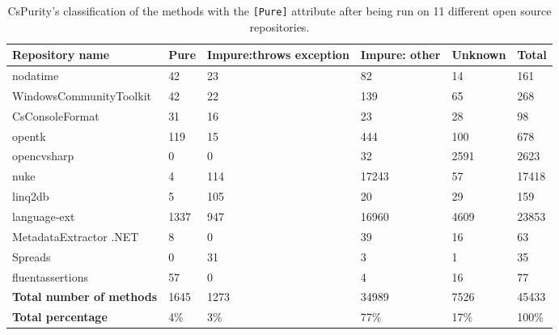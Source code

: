 \documentclass[a4paper,12pt]{article}
\begin{document}

\begin{table}[H]
  \small
  \caption{CsPurity's classification of the methods with the \texttt{[Pure]} attribute after being run on 11 different open source repositories.}
  \label{tab:results-pure-methods}
  \centering
  \begin{tabular}{|l|lp{2.8cm}p{1.4cm}l|l|}
    \hline
    \textbf{Repository name} & \textbf{Pure} & \textbf{Impure:\newline throws exception} & \textbf{Impure: other} & \textbf{Unknown} & \textbf{Total} \\
    \hline
    nodatime                & 42   & 23   & 82    & 14   & 161   \\
    WindowsCommunityToolkit & 42   & 22   & 139   & 65   & 268   \\
    CsConsoleFormat         & 31   & 16   & 23    & 28   & 98    \\
    opentk                  & 119  & 15   & 444   & 100  & 678   \\
    opencvsharp             & 0    & 0    & 32    & 2591 & 2623  \\
    nuke                    & 4    & 114  & 17243 & 57   & 17418 \\
    linq2db                 & 5    & 105  & 20    & 29   & 159   \\
    language-ext            & 1337 & 947  & 16960 & 4609 & 23853 \\
    MetadataExtractor .NET  & 8    & 0    & 39    & 16   & 63    \\
    Spreads                 & 0    & 31   & 3     & 1    & 35    \\
    fluentassertions        & 57   & 0    & 4     & 16   & 77    \\
    \hline
    \rowcolor{lightgray} \textbf{Total number of methods} & 1645 & 1273 & 34989 & 7526 & \cellcolor{white} 45433 \\
    \rowcolor{lightgray} \textbf{Total percentage}        & 4\%  & 3\%  & 77\%  & 17\% & \cellcolor{white} 100\% \\
    \hline
  \end{tabular}
\end{table}
\end{document}
